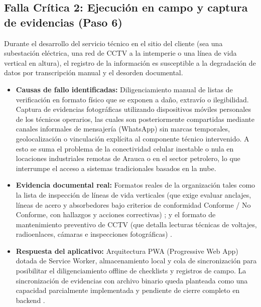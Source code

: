\subsection{Falla Crítica 2: Ejecución en campo y captura de evidencias (Paso 6)}
Durante el desarrollo del servicio técnico en el sitio del cliente (sea una subestación eléctrica, una red de CCTV a la intemperie o una línea de vida vertical en altura), el registro de la información es susceptible a la degradación de datos por transcripción manual y el desorden documental.
\begin{itemize}
    \item \textbf{Causas de fallo identificadas:} Diligenciamiento manual de listas de verificación en formato físico que se exponen a daño, extravío o ilegibilidad. Captura de evidencias fotográficas utilizando dispositivos móviles personales de los técnicos operarios, las cuales son posteriormente compartidas mediante canales informales de mensajería (WhatsApp) sin marcas temporales, geolocalización o vinculación explícita al componente técnico intervenido. A esto se suma el problema de la conectividad celular inestable o nula en locaciones industriales remotas de Arauca o en el sector petrolero, lo que interrumpe el acceso a sistemas tradicionales basados en la nube.
    \item \textbf{Evidencia documental real:} Formatos reales de la organización tales como la lista de inspección de líneas de vida verticales (que exige evaluar anclajes, líneas de acero y absorbedores bajo criterios de conformidad Conforme / No Conforme, con hallazgos y acciones correctivas) \cite{formato_lineas_vida}; y el formato de mantenimiento preventivo de CCTV (que detalla lecturas técnicas de voltajes, radioenlaces, cámaras e inspecciones fotográficas) \cite{formato_cctv}.
    \item \textbf{Respuesta del aplicativo:} Arquitectura PWA (Progressive Web App) dotada de Service Worker, almacenamiento local y cola de sincronización para posibilitar el diligenciamiento offline de checklists y registros de campo. La sincronización de evidencias con archivo binario queda planteada como una capacidad parcialmente implementada y pendiente de cierre completo en backend \cite{mdn_service_worker}.
\end{itemize}

